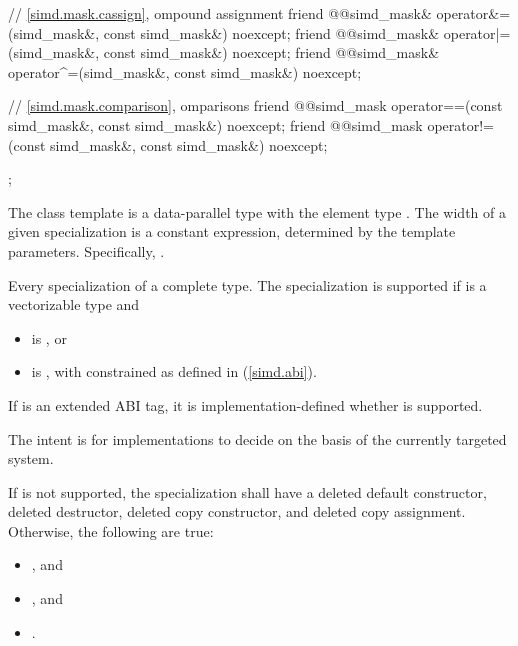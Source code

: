 \begin{codeblock}
{  // \ref{simd.mask.cassign}, ompound assignment
  friend @@simd_mask& operator&=(simd_mask&, const simd_mask&) noexcept;
  friend @@simd_mask& operator|=(simd_mask&, const simd_mask&) noexcept;
  friend @@simd_mask& operator^=(simd_mask&, const simd_mask&) noexcept;

  // \ref{simd.mask.comparison}, omparisons
  friend @@simd_mask operator==(const simd_mask&, const simd_mask&) noexcept;
  friend @@simd_mask operator!=(const simd_mask&, const simd_mask&) noexcept;
};
\end{codeblock}

\pnum
The class template  is a data-parallel type with the element type . The width of a given  specialization is a constant expression, determined by the template parameters. Specifically, .

\pnum
Every specialization of   a complete type. The specialization  is supported if  is a vectorizable type and
\begin{itemize}
  \item {} is , or
  \item {} is , with  constrained as defined in (\ref{simd.abi}).
\end{itemize}

If  is an extended ABI tag, it is implementation-defined whether  is supported. \begin{note}The intent is for implementations to decide on the basis of the currently targeted system.\end{note}

If  is not supported, the specialization shall have a deleted default constructor, deleted destructor, deleted copy constructor, and deleted copy assignment.
Otherwise, the following are true:
\begin{itemize}
  \item {}, and
  \item {}, and
  \item {}.
\end{itemize}

